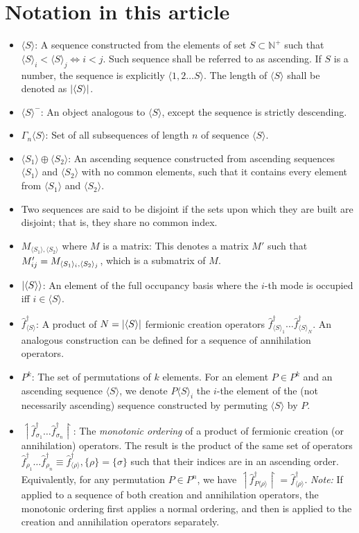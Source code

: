 \documentclass[12pt]{article}
\newcommand{\seq}[1]{\langle #1\rangle}
\newcommand{\asc}[1]{\upharpoonleft #1 \upharpoonright}
\newcommand{\hc}{^\dagger}
\begin{document}
	\appendix
	
	\section{Notation in this article}
	\begin{itemize}
		\item $\seq{S}$: A sequence constructed from the elements of set $S\subset \mathbb{N}^+$ such that\\ $\seq{S}_i< \seq{S}_j\iff i<j$. Such sequence shall be referred to as ascending. If $S$ is a number, the sequence is explicitly $\seq{1, 2\dots S}$. The length of $\seq{S}$ shall be denoted as $\abs{\seq{S}}$.
		\item $\seq{S}^-$: An object analogous to $\seq{S}$, except the sequence is strictly descending.
		\item $\Gamma_n\seq{S}$: Set of all subsequences of length $n$ of sequence $\seq{S}$.
		\item $\seq{S_1}\oplus\seq{S_2}$: An ascending sequence constructed from ascending sequences $\seq{S_1}$ and $\seq{S_2}$ with no common elements, such that it contains every element from $\seq{S_1}$ and $\seq{S_2}$.
		\item Two sequences are said to be disjoint if the sets upon which they are built are disjoint; that is, they share no common index.
		\item $M_{\seq{S_1},\seq{S_2}}$ where $M$ is a matrix: This denotes a matrix $M'$ such that $M'_{ij}=\nolinebreak M_{\seq{S_1}_i,\seq{S_2}_j}$, which is a submatrix of $M$.
		\item $\ket{\seq{S}}$: An element of the full occupancy basis where the $i$-th mode is occupied iff $i\in\seq{S}$.
		\item $\hat{f}\hc_{\seq{S}}$: A product of $N=\abs{\seq{S}}$ fermionic creation operators $\hat{f}\hc_{\seq{S}_1}\dots \hat{f}\hc_{\seq{S}_N}$. An analogous construction can be defined for a sequence of annihilation operators.
		\item $P^k$: The set of permutations of $k$ elements. For an element $P\in P^k$ and an ascending sequence $\seq{S}$, we denote $P\seq{S}_i$ the $i$-the element of the (not necessarily ascending) sequence constructed by permuting $\seq{S}$ by $P$.
		\item $\asc{\hat{f}\hc_{\sigma_1}\dots\hat{f}\hc_{\sigma_n}}$: The \textit{monotonic ordering} of a product of fermionic creation (or annihilation) operators. The result is the product of the same set of operators $\hat{f}\hc_{\rho_1}\dots\hat{f}\hc_{\rho_n}\equiv \hat{f}\hc_{\seq{\rho}}, \{\rho\}=\{\sigma\}$ such that their indices are in an ascending order. Equivalently, for any permutation $P\in P^n$, we have $\asc{\hat{f}\hc_{P\seq{\rho}}}=\hat{f}\hc_{\seq{\rho}}$. \textit{Note:} If applied to a sequence of both creation and annihilation operators, the monotonic ordering first applies a normal ordering, and then is applied to the creation and annihilation operators separately.

\end{itemize}
\end{document}
